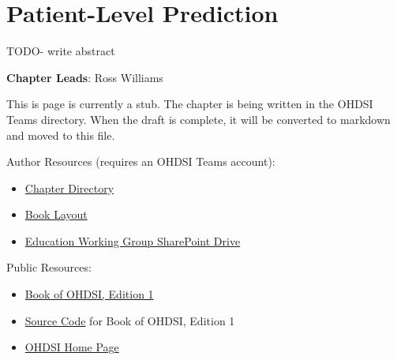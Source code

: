 \documentclass[
  letterpaper,
  paper=7in:10in,
  pagesize=pdftex,
  headinclude=on,
  footinclude=on,
  12pt]{scrbook}
\providecommand{\tightlist}{%
  \setlength{\itemsep}{0pt}\setlength{\parskip}{0pt}}\usepackage{longtable,booktabs,array}
\begin{document}
\chapter{Patient-Level Prediction}\label{sec-analytics-patient}

TODO- write abstract

\hfill\break

\textbf{Chapter Leads}: Ross Williams

\begin{tcolorbox}[enhanced jigsaw, opacitybacktitle=0.6, coltitle=black, colback=white, bottomrule=.15mm, bottomtitle=1mm, title=\textcolor{quarto-callout-note-color}{\faInfo}\hspace{0.5em}{Note}, titlerule=0mm, rightrule=.15mm, colbacktitle=quarto-callout-note-color!10!white, colframe=quarto-callout-note-color-frame, toptitle=1mm, arc=.35mm, left=2mm, breakable, opacityback=0, leftrule=.75mm, toprule=.15mm]

This is page is currently a stub. The chapter is being written in the
OHDSI Teams directory. When the draft is complete, it will be converted
to markdown and moved to this file.

Author Resources (requires an OHDSI Teams account):

\begin{itemize}
\tightlist
\item
  \href{https://ohdsiorg.sharepoint.com/sites/Workgroup-EducationWorkingGroup/Shared\%20Documents/Forms/AllItems.aspx?id=\%2Fsites\%2FWorkgroup\%2DEducationWorkingGroup\%2FShared\%20Documents\%2FSection\%20III\%20\%2D\%20Analytics\%2FChapter\%2014\%20PLP&viewid=05fec2cc\%2Dec8a\%2D4d04\%2Db565\%2Dcf1289b96f67}{Chapter
  Directory}
\item
  \href{https://ohdsiorg.sharepoint.com/:x:/r/sites/Workgroup-EducationWorkingGroup/_layouts/15/Doc2.aspx?action=edit&sourcedoc=\%7B1fa31e39-1c5f-4918-b878-609ebd9810b3\%7D&wdOrigin=TEAMS-WEB.teamsSdk_ns.rwc&wdExp=TEAMS-TREATMENT&wdhostclicktime=1748104477731&web=1}{Book
  Layout}
\item
  \href{https://ohdsiorg.sharepoint.com/sites/Workgroup-EducationWorkingGroup/Shared\%20Documents/Forms/AllItems.aspx?viewid=05fec2cc\%2Dec8a\%2D4d04\%2Db565\%2Dcf1289b96f67}{Education
  Working Group SharePoint Drive}
\end{itemize}

Public Resources:

\begin{itemize}
\tightlist
\item
  \href{https://ohdsi.github.io/TheBookOfOhdsi/}{Book of OHDSI, Edition
  1}
\item
  \href{https://github.com/OHDSI/TheBookOfOhdsi}{Source Code} for Book
  of OHDSI, Edition 1
\item
  \href{https://ohdsi.org/}{OHDSI Home Page}
\end{itemize}

\end{tcolorbox}
\end{document}
